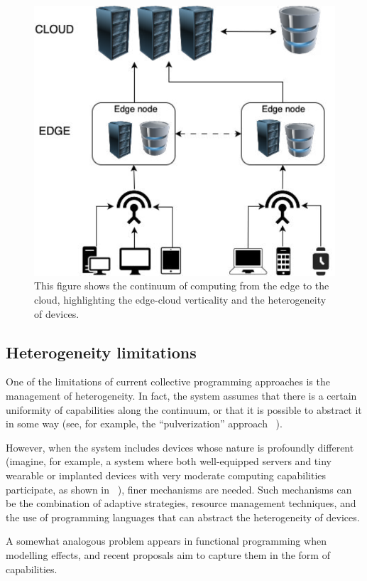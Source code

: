 \begin{figure}
    \centering
    \includegraphics[width=.5\linewidth]{figures/edge-cloud}
    \caption{This figure shows the continuum of computing from the edge to the cloud, highlighting the edge-cloud verticality
    and the heterogeneity of devices.}
    \label{fig:cloud-edge-continuum}
\end{figure}

\subsection{Heterogeneity limitations}
\label{subsec:heterogeneity-limitations}

One of the limitations of current collective programming approaches is the management of heterogeneity.
In fact, the system assumes that there is a certain uniformity of capabilities along the continuum, or that it is possible
to abstract it in some way (see, for example, the ``pulverization'' approach ~\cite{fi12110203}).

However, when the system includes devices whose nature is profoundly different (imagine, for example, a system where both
well-equipped servers and tiny wearable or implanted devices with very moderate computing capabilities participate, as
shown in ~), finer mechanisms are needed.
Such mechanisms can be the combination of adaptive strategies, resource management techniques, and the use of programming
languages that can abstract the heterogeneity of devices.

A somewhat analogous problem appears in functional programming when modelling effects, and recent proposals aim to capture
them in the form of capabilities.

